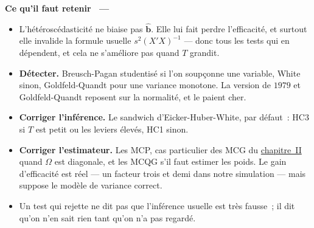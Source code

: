 \documentclass[10pt,a4paper]{article}
\makeatletter
\newcommand{\siteurl}{https://le-mans.adjemian.eu/econometrics}
\newcommand{\chapref}[2]{\href{\siteurl/chapitre-#1.pdf}{chapitre~#2}}
\theoremstyle{definition}
\renewcommand{\newline}{\unskip\par\vspace{1.5pt}}
\newenvironment{frame}[1][]{\par}{\par}
\newcommand{\frameheadrule}{%
  \par\nobreak\vspace{1pt}{\color{ctitle}\hrule height 0.6pt}\nobreak\vspace{4pt}}
\newcommand{\frametitle}[1]{%
  \par\addvspace{8pt plus 2pt}\needspace{6\baselineskip}%
  \noindent\begingroup\color{ctitle}\sffamily\bfseries\large #1\endgroup
  \@ifnextchar\framesubtitle{}{\frameheadrule}}
\newcommand{\framesubtitle}[1]{%
  \begingroup\color{ctitle}\sffamily\normalsize\ --- #1\endgroup\frameheadrule}
\makeatother
\begin{document}
\begin{frame}
  \frametitle{Ce qu'il faut retenir}

  \begin{itemize}

  \item L'hétéroscédasticité ne biaise pas $\hat{\mathbf b}$. Elle lui fait
    perdre l'efficacité, et surtout elle invalide la formule usuelle
    $s^2(X'X)^{-1}$ — donc tous les tests qui en dépendent, et cela ne
    s'améliore pas quand $T$ grandit.\newline

  \item \textbf{Détecter.} Breusch-Pagan studentisé si l'on soupçonne une
    variable, White sinon, Goldfeld-Quandt pour une variance
    monotone. La version
    de $1979$ et Goldfeld-Quandt reposent sur la normalité, et le paient
    cher.\newline

  \item \textbf{Corriger l'inférence.} Le sandwich d'Eicker-Huber-White, par
    défaut~: HC3 si $T$ est petit ou les leviers élevés, HC1 sinon.\newline

  \item \textbf{Corriger l'estimateur.} Les MCP, cas particulier des MCG du
    \chapref{2}{II} quand $\Omega$ est diagonale, et les MCQG s'il faut estimer
    les poids. Le gain d'efficacité est réel — un facteur trois et demi dans
    notre simulation — mais suppose le modèle de variance correct.\newline

  \item[$\Rightarrow$] Un test qui rejette ne dit pas que l'inférence usuelle
    est très fausse~; il dit qu'on n'en sait rien tant qu'on n'a pas regardé.

  \end{itemize}

\end{frame}
\end{document}
